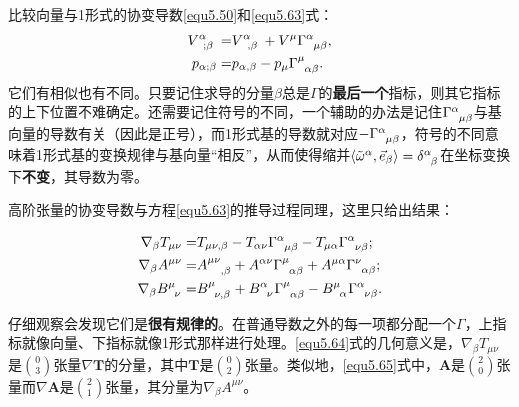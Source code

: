 比较向量与1形式的协变导数\eqref{equ5.50}和\eqref{equ5.63}式：
\begin{align*}
    V\indices{^\alpha_{; \beta}} =& V\indices{^\alpha_{, \beta}} + V^\mu \Gamma\indices{^\alpha_{\mu \beta}}, \\
    p_{\alpha; \beta} =& p_{\alpha, \beta} - p_\mu \Gamma\indices{^\mu_{\alpha \beta}}.
\end{align*}
它们有相似也有不同。只要记住求导的分量$\beta$总是$\Gamma$的\textbf{最后一个}指标，则其它指标的上下位置不难确定。还需要记住符号的不同，一个辅助的办法是记住$\Gamma\indices{^\alpha_{\mu \beta}}$与基向量的导数有关（因此是正号），而1形式基的导数就对应$-\Gamma\indices{^\alpha_{\mu \beta}}$，符号的不同意味着1形式基的变换规律与基向量“相反”，从而使得缩并$\langle \tilde{\omega}^\alpha, \vec{e}_\beta \rangle = \delta\indices{^\alpha_\beta}$在坐标变换下\textbf{不变}，其导数为零。

高阶张量的协变导数与方程\eqref{equ5.63}的推导过程同理，这里只给出结果：
\begin{shaded}
\begin{align}
    \nabla_\beta T_{\mu \nu} =& T_{\mu \nu, \beta} - T_{\alpha \nu} \Gamma\indices{^\alpha_{\mu \beta}} - T_{\mu \alpha} \Gamma\indices{^\alpha_{\nu \beta}} ; \label{equ5.64} \\
    \nabla_\beta A^{\mu \nu} =& A\indices{^{\mu \nu}_{, \beta}} + A^{\alpha \nu} \Gamma\indices{^\mu_{\alpha \beta}} + A^{\mu \alpha} \Gamma\indices{^\nu_{\alpha \beta}}; \label{equ5.65} \\
    \nabla_\beta B\indices{^\mu_\nu} =& B\indices{^\mu_{\nu, \beta}} + B\indices{^\alpha_\nu} \Gamma\indices{^\mu_{\alpha \beta}} - B\indices{^\mu_\alpha} \Gamma\indices{^\alpha_{\nu \beta}}. \label{equ5.66}
\end{align}
\end{shaded}
仔细观察会发现它们是\textbf{很有规律的}。在普通导数之外的每一项都分配一个$\Gamma$，上指标就像向量、下指标就像1形式那样进行处理。\eqref{equ5.64}式的几何意义是，$\nabla_\beta T_{\mu \nu}$是$\binom{0}{3}$张量$\nabla \mathbf{T}$的分量，其中$\mathbf{T}$是$\binom{0}{2}$张量。类似地，\eqref{equ5.65}式中，$\mathbf{A}$是$\binom{2}{0}$张量而$\nabla \mathbf{A}$是$\binom{2}{1}$张量，其分量为$\nabla_\beta A^{\mu \nu}$。

